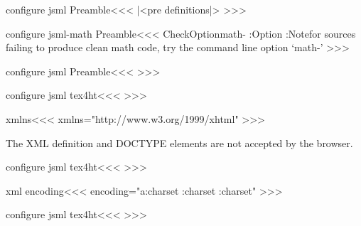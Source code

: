\<configure jsml Preamble\><<<
|<pre definitions|>
>>>


\<configure jsml-math Preamble\><<<
\:CheckOption{math-}     \if:Option 
    \edef\Preamble{\Preamble,mathml-}
\else
   \Log:Note{for sources failing to produce
       clean math code, try the command line option `math-'}%
\fi
>>>






\<configure jsml Preamble\><<<
    {}          
>>>




\<configure jsml tex4ht\><<<
  {\IgnorePar{}}
  {\ifvmode\IgnorePar\fi{}}
>>>

\<xmlns\><<<
xmlns="http://www.w3.org/1999/xhtml"
>>>


The XML definition and DOCTYPE elements are not accepted by the
browser.


\<configure jsml tex4ht\><<<
    {}          
>>>

\<xml encoding\><<<
encoding="\expandafter\ifx \csname a:charset\endcsname\relax
         \expandafter{}\A:charset
   \else \expandafter{}\a:charset\fi"
>>>



\<configure jsml tex4ht\><<<
  {}
\def\xhtml:DOCTYPE{PUBLIC
     "-//W3C//DTD XHTML 1.0 Transitional//|<dtd lang|>"\Hnewline
    \space\space "http://www.w3.org/TR/xhtml1/DTD/xhtml1-transitional.dtd"}
>>>


% 


